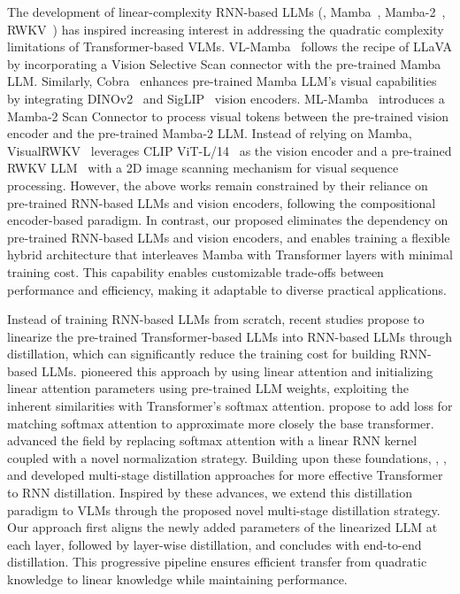 The development of linear-complexity RNN-based LLMs (\eg, Mamba~\cite{mamba}, Mamba-2~\cite{Mamba-2}, RWKV~\cite{rwkv}) has inspired increasing interest in addressing the quadratic complexity limitations of Transformer-based VLMs.
VL-Mamba~\cite{vlmamba} follows the recipe of LLaVA by incorporating a Vision Selective Scan connector with the pre-trained Mamba LLM.
Similarly, Cobra~\cite{cobra} enhances pre-trained Mamba LLM's visual capabilities by integrating DINOv2~\cite{dinov2} and SigLIP~\cite{sigclip} vision encoders.
ML-Mamba~\cite{mlmamba} introduces a Mamba-2 Scan Connector to process visual tokens between the pre-trained vision encoder and the pre-trained Mamba-2 LLM.
Instead of relying on Mamba, VisualRWKV~\cite{visualrwkv} leverages CLIP ViT-L/14~\cite{clip} as the vision encoder and a pre-trained RWKV LLM~\cite{rwkv,rwkv6} with a 2D image scanning mechanism for visual sequence processing.
However, the above works remain constrained by their reliance on pre-trained RNN-based LLMs and vision encoders, following the compositional encoder-based paradigm.
In contrast, our proposed \name{} eliminates the dependency on pre-trained RNN-based LLMs and vision encoders, and enables training a flexible hybrid architecture that interleaves Mamba with Transformer layers with minimal training cost. This capability enables customizable trade-offs between performance and efficiency, making it adaptable to diverse practical applications.

Instead of training RNN-based LLMs from scratch, recent studies propose to linearize the pre-trained Transformer-based LLMs into RNN-based LLMs through distillation, which can significantly reduce the training cost for building RNN-based LLMs.
\citet{kasai2021finetuning} pioneered this approach by using linear attention and initializing linear attention parameters using pre-trained LLM weights, exploiting the inherent similarities with Transformer's softmax attention.
\citet{zhang2024hedgehog} propose to add loss for matching softmax attention to approximate more closely the base transformer.   
\citet{mercat2024linearizing} advanced the field by replacing softmax attention with a linear RNN kernel coupled with a novel normalization strategy. 
Building upon these foundations, \citet{bick2024transformers}, \citet{wang2024mamba}, and \citet{zhang2024lolcats} developed multi-stage distillation approaches for more effective Transformer to RNN distillation.
Inspired by these advances, we extend this distillation paradigm to VLMs through the proposed novel multi-stage distillation strategy. Our approach first aligns the newly added parameters of the linearized LLM at each layer, followed by layer-wise distillation, and concludes with end-to-end distillation. This progressive pipeline ensures efficient transfer from quadratic knowledge to linear knowledge while maintaining performance.

